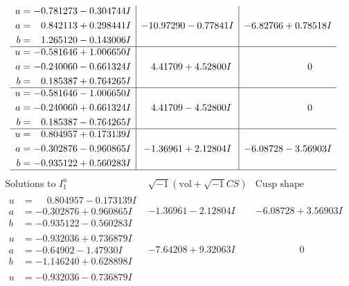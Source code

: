 \documentclass[1p]{elsarticle_modified}
\theoremstyle{definition}
\newcommand{\I}{\sqrt{-1}}
\begin{document}
$$\begin{array}{c|c|c}
\begin{aligned}
u &= -0.781273 - 0.304744 I \\
a &= \phantom{-}0.842113 + 0.298441 I \\
b &= \phantom{-}1.265120 - 0.143006 I\end{aligned}
 & -10.97290 - 0.77841 I & -6.82766 + 0.78518 I \\ \hline\begin{aligned}
u &= -0.581646 + 1.006650 I \\
a &= -0.240060 - 0.661324 I \\
b &= \phantom{-}0.185387 + 0.764265 I\end{aligned}
 & \phantom{-}4.41709 + 4.52800 I & \phantom{-0.000000 } 0 \\ \hline\begin{aligned}
u &= -0.581646 - 1.006650 I \\
a &= -0.240060 + 0.661324 I \\
b &= \phantom{-}0.185387 - 0.764265 I\end{aligned}
 & \phantom{-}4.41709 - 4.52800 I & \phantom{-0.000000 } 0 \\ \hline\begin{aligned}
u &= \phantom{-}0.804957 + 0.173139 I \\
a &= -0.302876 - 0.960865 I \\
b &= -0.935122 + 0.560283 I\end{aligned}
 & -1.36961 + 2.12804 I & -6.08728 - 3.56903 I\\
 \hline 
 \end{array}$$\newpage$$\begin{array}{c|c|c}  
\text{Solutions to }I^u_{1}& \I (\text{vol} + \sqrt{-1}CS) & \text{Cusp shape}\\
 \hline 
\begin{aligned}
u &= \phantom{-}0.804957 - 0.173139 I \\
a &= -0.302876 + 0.960865 I \\
b &= -0.935122 - 0.560283 I\end{aligned}
 & -1.36961 - 2.12804 I & -6.08728 + 3.56903 I \\ \hline\begin{aligned}
u &= -0.932036 + 0.736879 I \\
a &= -0.64902 - 1.47930 I \\
b &= -1.146240 + 0.628898 I\end{aligned}
 & -7.64208 + 9.32063 I & \phantom{-0.000000 } 0 \\ \hline\begin{aligned}
u &= -0.932036 - 0.736879 I \\

\end{aligned}
\end{array}$$
\end{document}
